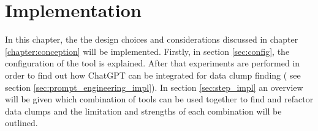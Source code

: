 \chapter{Implementation}

In this chapter, the the design choices and considerations discussed in chapter \ref{chapter:conception} will be implemented. Firstly, in section \ref{sec:config}, the configuration of the tool is explained. After that experiments are performed in order to find out how ChatGPT can be integrated for data clump finding ( see section \ref{sec:prompt_engineering_impl}). In section \ref{sec:step_impl} an overview will be given which combination of tools can be used together to find and refactor data clumps and the limitation and strengths of each combination will be outlined. 




